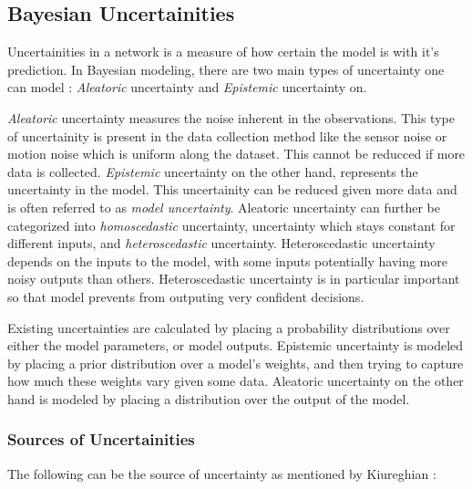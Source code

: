 \subsection{Bayesian Uncertainities}

Uncertainities in a network is a measure of how certain the model is with it's prediction. In Bayesian modeling, there are two main types of uncertainty one can model \citep{der2009aleatory}: \textit{Aleatoric} uncertainty and \textit{Epistemic} uncertainty on. 

\textit{Aleatoric} uncertainty measures the noise inherent in the observations. This type of uncertainity is present in the data collection method like the sensor noise or motion noise which is uniform along the dataset. This cannot be reducced if more data is collected. \textit{Epistemic} uncertainty on the other hand, represents the uncertainty in the model. This uncertainity can be reduced given more data and is often referred to as \textit{model uncertainty}.  Aleatoric uncertainty can further be categorized into \textit{homoscedastic} uncertainty, uncertainty which stays constant for different inputs, and \textit{heteroscedastic} uncertainty. Heteroscedastic uncertainty depends on the inputs to the model, with some inputs potentially having more noisy outputs than others. Heteroscedastic uncertainty is in particular important so that model prevents from outputing very confident decisions.

Existing uncertainties are calculated by placing a probability distributions over either the model parameters, or model outputs. Epistemic uncertainty is modeled by placing a prior distribution over a model's weights, and then trying to capture how much these weights vary given some data. Aleatoric uncertainty on the other hand is modeled by placing a distribution over the output of the model.

\subsubsection{Sources of Uncertainities}

The following can be the source of uncertainty as mentioned by Kiureghian \cite{Kiureghian}:

